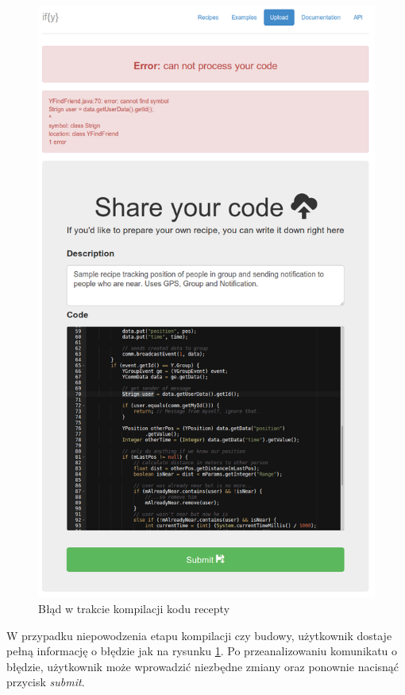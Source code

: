 \documentclass[11pt,a4paper,polish,thesis]{dcsbook}
\begin{document}
\begin{figure}[H]
  \centering
  \includegraphics[scale=0.4]{./resources/market_error.png}
  \caption{Błąd w trakcie kompilacji kodu recepty}
  \label{fig:market_error}
\end{figure}
W przypadku niepowodzenia etapu kompilacji czy budowy, użytkownik
dostaje pełną informację o błędzie jak na rysunku \ref{fig:market_error}. Po przeanalizowaniu komunikatu o błędzie, użytkownik może wprowadzić niezbędne zmiany oraz
ponownie nacisnąć przycisk \emph{submit}.
\end{document}
